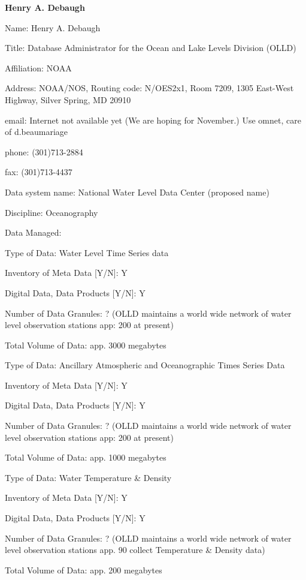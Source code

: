 \begin{center}
\LARGE
{\bf  Henry A. Debaugh}
\end{center}
\large
{}
\normalsize
\smallskip
\begin{description}
\item{Name:}  Henry A. Debaugh
\item{Title:}  Database Administrator for the Ocean and Lake Levels 
Division (OLLD)
\item{Affiliation:}  NOAA
\item{Address:}  NOAA/NOS, Routing code:  N/OES2x1, Room 7209, 1305 
East-West Highway, Silver Spring, MD  20910
\item{email:}  Internet not available yet (We are hoping for November.)  
Use omnet, care of d.beaumariage
\item{phone:}  (301)713-2884
\item{fax:}  (301)713-4437
\end{description}
\medskip
\large
{}
\normalsize
\medskip
\begin{description}

\item{Data system name:}  National Water Level Data Center (proposed 
name)
\item{Discipline:}  Oceanography
\item{Data Managed:}
	\begin{description}
	\item{Type of Data:}  Water Level Time Series data
	\item{Inventory of Meta Data [Y/N]:}  Y
	\item{Digital Data, Data Products [Y/N]:}  Y
	\item{Number of Data Granules:}  ?  (OLLD maintains a world wide 
network of water level observation stations app:  200 at present)
	\item{Total Volume of Data:}  app. 3000 megabytes
\medskip
	\item{Type of Data:}  Ancillary Atmospheric and Oceanographic 
Times Series Data
	\item{Inventory of Meta Data [Y/N]:}  Y
	\item{Digital Data, Data Products [Y/N]:}  Y
	\item{Number of Data Granules:}  ?  (OLLD maintains a world wide 
network of water level observation stations app:  200 at present)
	\item{Total Volume of Data:}  app. 1000 megabytes
\medskip
	\item{Type of Data:}  Water Temperature \& Density
	\item{Inventory of Meta Data [Y/N]:}  Y
	\item{Digital Data, Data Products [Y/N]:}  Y
	\item{Number of Data Granules:}  ?  (OLLD maintains a world wide 
network of water level observation stations app. 90 collect Temperature 
\& Density data)
	\item{Total Volume of Data:}  app. 200 megabytes
	\end{description}
\end{description}


